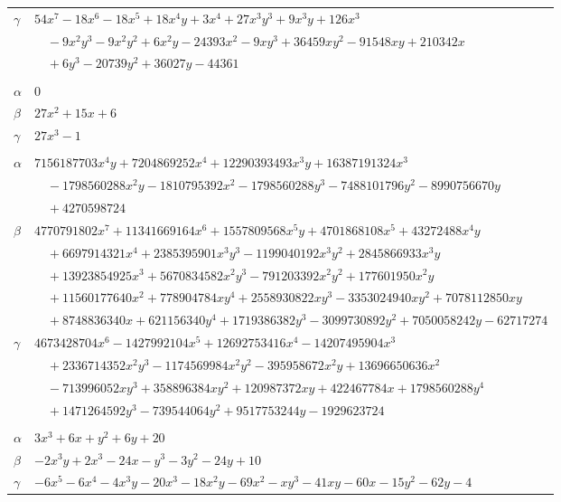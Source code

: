 \documentclass[11pt]{article}
\begin{document}
\begin{longtable}{@{}ll@{}}
$\gamma$ & $54x^{7}-18x^{6}-18x^{5}+18x^{4}y+3x^{4}+27x^{3}y^{3}+9x^{3}y+126x^{3}$\\
 & $\quad -9x^{2}y^{3}-9x^{2}y^{2}+6x^{2}y-24393x^{2}-9xy^{3}+36459xy^{2}-91548xy+210342x$\\
 & $\quad +6y^{3}-20739y^{2}+36027y-44361$\\
\addlinespace[3pt]
\multicolumn{2}{@{}l}{$\{i,j\}=\{84,190\}$, $k_{ij}=2\cdot 7$}\\
$\alpha$ & $0$\\
$\beta$ & $27x^{2}+15x+6$\\
$\gamma$ & $27x^{3}-1$\\
\addlinespace[3pt]
\multicolumn{2}{@{}l}{$\{i,j\}=\{86,87\}$, $k_{ij}=2^{3}\cdot 3^{2}\cdot 5^{5}\cdot 7^{4}\cdot 13$}\\
$\alpha$ & $7156187703x^{4}y+7204869252x^{4}+12290393493x^{3}y+16387191324x^{3}$\\
 & $\quad -1798560288x^{2}y-1810795392x^{2}-1798560288y^{3}-7488101796y^{2}-8990756670y$\\
 & $\quad +4270598724$\\
$\beta$ & $4770791802x^{7}+11341669164x^{6}+1557809568x^{5}y+4701868108x^{5}+43272488x^{4}y$\\
 & $\quad +6697914321x^{4}+2385395901x^{3}y^{3}-1199040192x^{3}y^{2}+2845866933x^{3}y$\\
 & $\quad +13923854925x^{3}+5670834582x^{2}y^{3}-791203392x^{2}y^{2}+177601950x^{2}y$\\
 & $\quad +11560177640x^{2}+778904784xy^{4}+2558930822xy^{3}-3353024940xy^{2}+7078112850xy$\\
 & $\quad +8748836340x+621156340y^{4}+1719386382y^{3}-3099730892y^{2}+7050058242y-62717274$\\
$\gamma$ & $4673428704x^{6}-1427992104x^{5}+12692753416x^{4}-14207495904x^{3}$\\
 & $\quad +2336714352x^{2}y^{3}-1174569984x^{2}y^{2}-395958672x^{2}y+13696650636x^{2}$\\
 & $\quad -713996052xy^{3}+358896384xy^{2}+120987372xy+422467784x+1798560288y^{4}$\\
 & $\quad +1471264592y^{3}-739544064y^{2}+9517753244y-1929623724$\\
\addlinespace[3pt]
\multicolumn{2}{@{}l}{$\{i,j\}=\{87,105\}$, $k_{ij}=2\cdot 3^{2}\cdot 5$}\\
$\alpha$ & $3x^{3}+6x+y^{2}+6y+20$\\
$\beta$ & $-2x^{3}y+2x^{3}-24x-y^{3}-3y^{2}-24y+10$\\
$\gamma$ & $-6x^{5}-6x^{4}-4x^{3}y-20x^{3}-18x^{2}y-69x^{2}-xy^{3}-41xy-60x-15y^{2}-62y-4$\\

\end{longtable}
\end{document}
